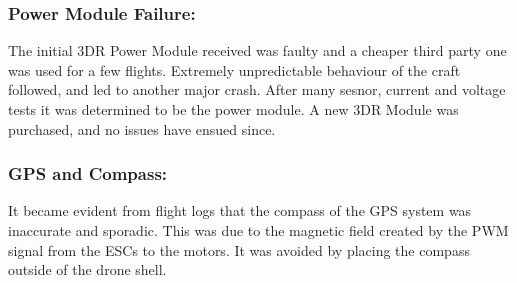 \subsubsection*{Power Module Failure:}  The initial 3DR Power Module received was faulty and a cheaper third party one was used for a few flights. Extremely unpredictable behaviour of the craft followed, and led to another major crash. After many sesnor, current and voltage tests it was determined to be the power module. A new 3DR Module was purchased, and no issues have ensued since.  
\subsubsection*{GPS and Compass:}  It became evident from flight logs that the compass of the GPS system was inaccurate and sporadic. This was due to the magnetic field created by the PWM signal from the ESCs to the motors. It was avoided by placing the compass outside of the drone shell.
